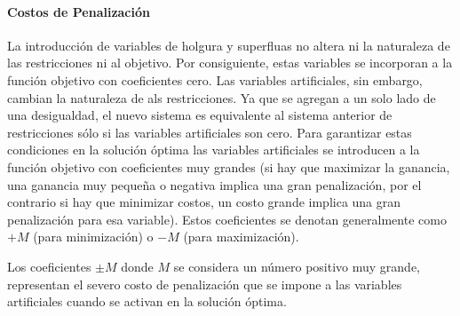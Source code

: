 




\paragraph{Costos de Penalización}

La introducción de variables de holgura y superfluas no altera ni la naturaleza de las restricciones ni al objetivo. Por consiguiente, estas variables se incorporan a la función objetivo con coeficientes cero. Las variables artificiales, sin embargo, cambian la naturaleza de als restricciones. Ya que se agregan a un solo lado de una desigualdad, el nuevo sistema es equivalente al sistema anterior de restricciones sólo si las variables artificiales son cero. Para garantizar estas condiciones en la solución óptima las variables artificiales se introducen a la función objetivo con coeficientes muy grandes (si hay que maximizar la ganancia, una ganancia muy pequeña o negativa implica una gran penalización, por el contrario si hay que minimizar costos, un costo grande implica una gran penalización para esa variable). Estos coeficientes se denotan generalmente como \(+M\) (para minimización) o \(-M\) (para maximización).

Los coeficientes \(\pm M\) donde \(M\) se considera un número positivo muy grande, representan el severo costo de penalización que se impone a las variables artificiales cuando se activan en la solución óptima. 